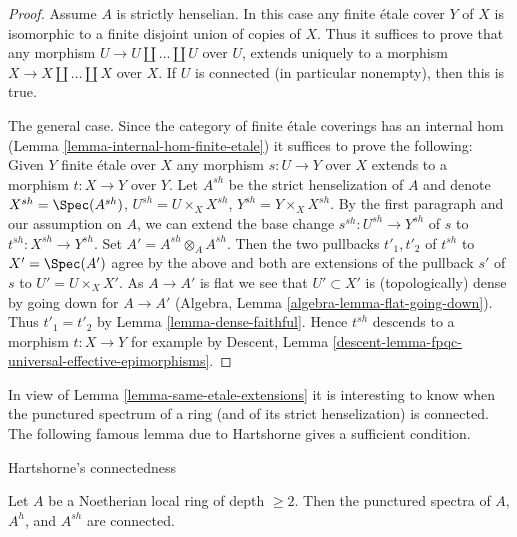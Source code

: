 \begin{proof}
Assume $A$ is strictly henselian. In this case any finite \'etale
cover $Y$ of $X$ is isomorphic to a finite disjoint union of
copies of $X$. Thus it suffices to prove that any morphism
$U \to U \amalg \ldots \amalg U$ over $U$, extends uniquely to a morphism
$X \to X \amalg \ldots \amalg X$ over $X$.
If $U$ is connected (in particular nonempty), then this is true.

\medskip\noindent
The general case. Since the category of finite \'etale coverings has an
internal hom (Lemma \ref{lemma-internal-hom-finite-etale})
it suffices to prove the following: Given $Y$ finite \'etale over $X$
any morphism $s : U \to Y$ over $X$ extends to a morphism $t : X \to Y$
over $Y$. Let $A^{sh}$ be the strict henselization of $A$ and denote
$X^{sh} = \Spec(A^{sh})$, $U^{sh} = U \times_X X^{sh}$,
$Y^{sh} = Y \times_X X^{sh}$. By the first paragraph and our assumption
on $A$, we can extend the base change $s^{sh} : U^{sh} \to Y^{sh}$ of $s$ to
$t^{sh} : X^{sh} \to Y^{sh}$. Set $A' = A^{sh} \otimes_A A^{sh}$.
Then the two pullbacks $t'_1, t'_2$ of $t^{sh}$ to $X' = \Spec(A')$
agree by the above and both are extensions of the pullback $s'$
of $s$ to $U' = U \times_X X'$.
As $A \to A'$ is flat we see that $U' \subset X'$ is (topologically) dense
by going down for $A \to A'$
(Algebra, Lemma \ref{algebra-lemma-flat-going-down}). Thus
$t'_1 = t'_2$ by Lemma \ref{lemma-dense-faithful}.
Hence $t^{sh}$ descends to a morphism $t : X \to Y$
for example by
Descent, Lemma \ref{descent-lemma-fpqc-universal-effective-epimorphisms}.
\end{proof}

\noindent
In view of Lemma \ref{lemma-same-etale-extensions}
it is interesting to know when the
punctured spectrum of a ring (and of its strict henselization)
is connected. The following famous lemma due to Hartshorne
gives a sufficient condition.

\begin{lemma}
\label{lemma-depth-2-connected-punctured-spectrum}
\begin{reference}
\cite[Proposition 2.1]{Hartshorne-connectedness}
\end{reference}
\begin{slogan}
Hartshorne's connectedness
\end{slogan}
Let $A$ be a Noetherian local ring of depth $\geq 2$.
Then the punctured spectra of $A$, $A^h$, and $A^{sh}$ are connected.
\end{lemma}

